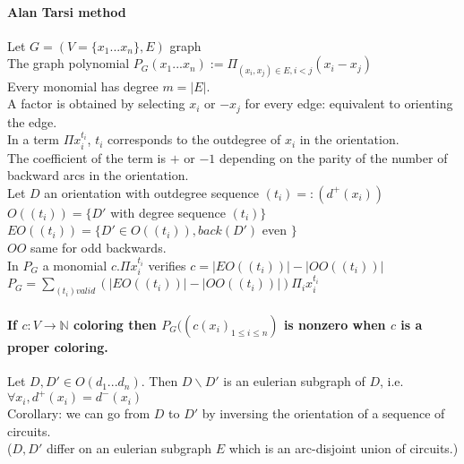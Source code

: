 \documentclass[12pt]{article}
\begin{document}
\paragraph{Alan Tarsi method\\}
Let $G=(V=\{ x_1 ... x_n \},E)$ graph\\
The graph polynomial $P_G(x_1 ... x_n) := \Pi_{(x_i,x_j) \in E, i<j} (x_i - x_j)$\\
Every monomial has degree $m = |E|$.\\
A factor is obtained by selecting $x_i$ or $-x_j$ for every edge: equivalent to orienting the edge.\\
In a term $\Pi x_i^{t_i}$, $t_i$ corresponds to the outdegree of $x_i$ in the orientation.\\
The coefficient of the term is $+$ or $- 1$ depending on the parity of the number of backward arcs in the orientation.\\
Let $D$ an orientation with outdegree sequence $(t_i) =: (d^+(x_i))$\\
$ O((t_i)) = \{ D'$ with degree sequence $(t_i) \}$\\
$EO((t_i)) = \{ D' \in O((t_i)), back(D')$ even $\}$\\
$OO$ same for odd backwards.\\
In $P_G$ a monomial $c . \Pi x_i^{t_i}$ verifies $c = |EO((t_i))| - |OO((t_i))|$\\
$P_G = \sum\limits_{(t_i) valid}(|EO((t_i))| - |OO((t_i))|) \Pi_i x_i^{t_i}$\\

\paragraph{If $c : V \rightarrow \mathbb{N}$  coloring then $P_G((c(x_i)_{1 \leqslant i \leqslant n})$ is nonzero when $c$ is a proper coloring.\\}

Let $D,D' \in O(d_1 ... d_n)$. Then $D \backslash D'$ is an eulerian subgraph of $D$, i.e. $\forall x_i, d^+(x_i) = d^-(x_i)$\\
Corollary: we can go from $D$ to $D'$ by inversing the orientation of a sequence of circuits.\\
($D, D'$ differ on an eulerian subgraph $E$ which is an arc-disjoint union of circuits.)\\
\end{document}
